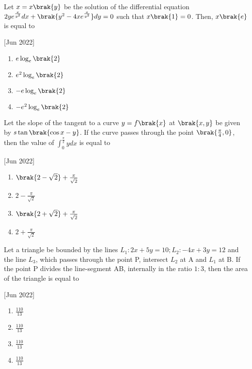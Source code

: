     \item Let $x=x\brak{y}$ be the solution of the differential equation $2ye^{\frac{x}{y^2}}dx+\brak{y^2-4xe^{\frac{x}{y^2}}}dy=0$ such that $x\brak{1}=0$. Then, $x\brak{e}$ is equal to
    
    \hfill[Jun 2022]
    
        \begin{multicols}{4}
            \begin{enumerate}
                \item $e\log_e\brak{2}$
                \item $e^2\log_e\brak{2}$
                \item $-e\log_e\brak{2}$
                \item $-e^2\log_e\brak{2}$
            \end{enumerate}
        \end{multicols}
        
    \item Let the slope of the tangent to a curve $y=f\brak{x}$ at $\brak{x,y}$ be given by $s\tan\brak{\cos x-y}$. If the curve passes through the point $\brak{\frac{\pi}{4},0}$, then the value of $\int_0^{\frac{\pi}{2}}ydx$ is equal to
    
    \hfill[Jun 2022]

        \begin{multicols}{4}
            \begin{enumerate}
                \item $\brak{2-\sqrt{2}}+\frac{\pi}{\sqrt{2}}$
                \item $2-\frac{\pi}{\sqrt{2}}$
                \item $\brak{2+\sqrt{2}}+\frac{\pi}{\sqrt{2}}$
                \item $2+\frac{\pi}{\sqrt{2}}$
            \end{enumerate}
        \end{multicols}

    \item Let a triangle be bounded by the lines $L_1:2x+5y=10;L_2:-4x+3y=12$ and the line $L_3$, which passes through the point P, intersect $L_2$ at A and $L_1$ at B. If the point P divides the line-segment AB, internally in the ratio $1:3$, then the area of the triangle is equal to
    
    \hfill[Jun 2022]

        \begin{multicols}{4}
            \begin{enumerate}
                \item $\frac{110}{13}$
                \item $\frac{110}{13}$
                \item $\frac{110}{13}$
                \item $\frac{110}{13}$
            \end{enumerate}
        \end{multicols}
        

